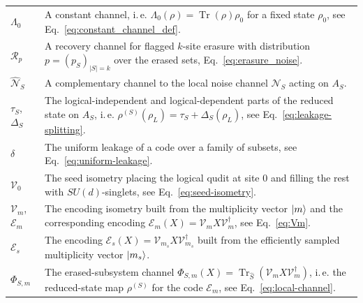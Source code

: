 \documentclass[10pt,twocolumn,superscriptaddress,aps,amsmath,amssymb,citeautoscript,floatfix,prx]{revtex4-2}
\theoremstyle{plain}
\theoremstyle{plain}
\theoremstyle{plain}
\theoremstyle{plain}
\theoremstyle{plain}
\theoremstyle{plain}
\theoremstyle{plain}
\theoremstyle{definition}
\theoremstyle{plain}
\begin{document}
\begin{appendix}
\begin{tabular}{@{}ll@{}}
\parbox[t]{0.22\textwidth}{$\Lambda_0$} & \parbox[t]{0.72\textwidth}{A constant channel, i.\,e. $\Lambda_0(\rho)=\operatorname{Tr}(\rho)\rho_0$ for a fixed state $\rho_0$, see Eq.~\eqref{eq:constant_channel_def}.} \\[0.6em]

\parbox[t]{0.22\textwidth}{$\mathcal R_p$} & \parbox[t]{0.72\textwidth}{A recovery channel for flagged $k$-site erasure with distribution $p=(p_S)_{|S|=k}$ over the erased sets, Eq.~\eqref{eq:erasure_noise}.} \\[0.6em]

\parbox[t]{0.22\textwidth}{$\widehat{\mathcal N}_S$} & \parbox[t]{0.72\textwidth}{A complementary channel to the local noise channel $\mathcal N_S$ acting on $A_S$.} \\[0.6em]

\parbox[t]{0.22\textwidth}{$\tau_S$, $\Delta_S$} & \parbox[t]{0.72\textwidth}{The logical-independent and logical-dependent parts of the reduced state on $A_S$, i.\,e. $\rho^{(S)}(\rho_L)=\tau_S+\Delta_S(\rho_L)$, see Eq.~\eqref{eq:leakage-splitting}.} \\[0.6em]

\parbox[t]{0.22\textwidth}{$\delta$} & \parbox[t]{0.72\textwidth}{The uniform leakage of a code over a family of subsets, see Eq.~\eqref{eq:uniform-leakage}.} \\[0.6em]

\parbox[t]{0.22\textwidth}{$\mathcal{V}_0$} & \parbox[t]{0.72\textwidth}{The seed isometry placing the logical qudit at site $0$ and filling the rest with $SU(d)$-singlets, see Eq.~\eqref{eq:seed-isometry}.} \\[0.6em]

\parbox[t]{0.22\textwidth}{$\mathcal{V}_m$, $\mathcal E_m$} & \parbox[t]{0.72\textwidth}{The encoding isometry built from the multiplicity vector $\ket m$ and the corresponding encoding $\mathcal E_m(X)=\mathcal{V}_mX\mathcal{V}_m^\dagger$, see Eq.~\eqref{eq:Vm}.} \\[0.6em]

\parbox[t]{0.22\textwidth}{$\mathcal E_s$} & \parbox[t]{0.72\textwidth}{The encoding $\mathcal E_s(X)=\mathcal{V}_{m_s}X\mathcal{V}_{m_s}^\dagger$ built from the efficiently sampled multiplicity vector $\ket{m_s}$.} \\[0.6em]

\parbox[t]{0.22\textwidth}{$\Phi_{S,m}$} & \parbox[t]{0.72\textwidth}{The erased-subsystem channel $\Phi_{S,m}(X)=\operatorname{Tr}_{\hat S}(\mathcal{V}_mX\mathcal{V}_m^\dagger)$, i.\,e. the reduced-state map $\rho^{(S)}$ for the code $\mathcal E_m$, see Eq.~\eqref{eq:local-channel}.} \\[0.6em]


\end{tabular}
\end{appendix}
\end{document}
